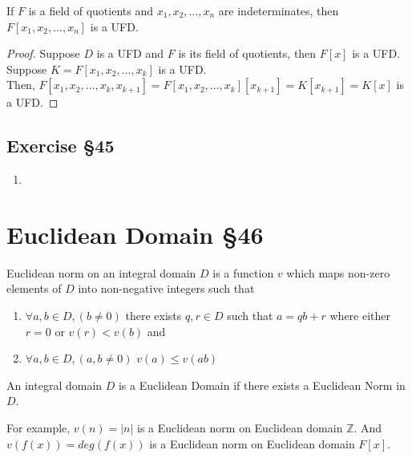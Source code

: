 \begin{corollary}
	If $F$ is a field of quotients and $x_1,x_2,\dots,x_n$ are indeterminates, then $F[x_1,x_2,\dots,x_n]$ is a UFD.
\end{corollary}
\begin{proof}
	Suppose $D$ is a UFD and $F$ is its field of quotients, then $F[x]$ is a UFD.\\

	Suppose $K = F[x_1,x_2,\dots,x_k]$ is a UFD.\\

	Then, $F[x_1,x_2,\dots,x_k,x_{k+1}] = F[x_1,x_2,\dots,x_k][x_{k+1}] = K[x_{k+1}] = K[x]$ is a UFD.
\end{proof}

\subsection{Exercise \S45}
\begin{enumerate}
	\item
\end{enumerate}

\section{Euclidean Domain \S46}
\begin{definition}
	Euclidean norm on an integral domain $D$ is a function $v$ which maps non-zero elements of $D$ into non-negative integers such that 
	\begin{enumerate}
		\item $\forall a,b \in D, (b \ne 0)$ there exists $q,r \in D$ such that $a = qb + r$ where  either $r = 0$ or $v(r) < v(b)$ and 
		\item $\forall a,b \in D, (a,b \ne 0)$ $v(a) \le v(ab)$
	\end{enumerate}
\end{definition}
\begin{definition}
	An integral domain $D$ is a Euclidean Domain if there exists a Euclidean Norm in $D$.
\end{definition}
For example, $v(n) = |n|$ is a Euclidean norm on Euclidean domain $\mathbb{Z}$. And $v(f(x)) = deg(f(x))$ is a Euclidean norm on Euclidean domain $F[x]$.

